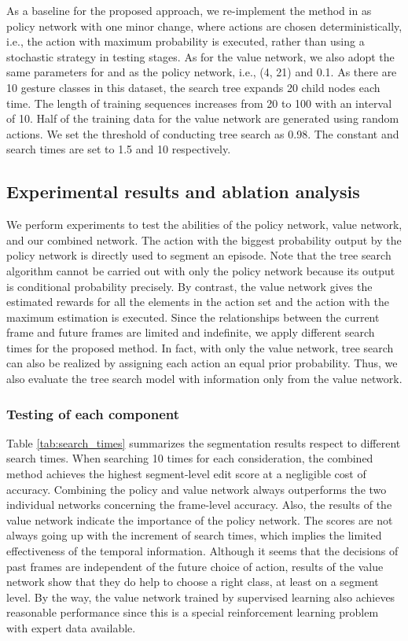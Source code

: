 \documentclass[letterpaper, 10 pt, conference]{ieeeconf}
\begin{document}
As a baseline for the proposed approach, we re-implement the method in \cite{liu2018deep} as policy network with one minor change, where actions are chosen deterministically, i.e., the action with maximum probability is executed, rather than using a stochastic strategy in testing stages. As for the value network, we also adopt the same parameters for  and  as the policy network, i.e., (4, 21) and 0.1. As there are 10 gesture classes in this dataset, the search tree expands 20 child nodes each time. The length  of training sequences increases from 20 to 100 with an interval of 10. Half of the training data for the value network are generated using random actions. We set the threshold of conducting tree search as 0.98. The constant  and search times are set to 1.5 and 10 respectively.


\subsection{Experimental results and ablation analysis}

We perform experiments to test the abilities of the policy network, value network, and our combined network. The action with the biggest probability output by the policy network is directly used to segment an episode. Note that the tree search algorithm cannot be carried out with only the policy network because its output is conditional probability precisely. By contrast, the value network gives the estimated rewards for all the elements in the action set and the action with the maximum estimation is executed. Since the relationships between the current frame and future frames are limited and indefinite, we apply different search times for the proposed method. In fact, with only the value network, tree search can also be realized by assigning each action an equal prior probability. Thus, we also evaluate the tree search model with information only from the value network. 

\subsubsection{Testing of each component}
Table \ref{tab:search_times} summarizes the segmentation results respect to different search times. When searching 10 times for each consideration, the combined method achieves the highest segment-level edit score at a negligible cost of accuracy. Combining the policy and value network always outperforms the two individual networks concerning the frame-level accuracy. Also, the results of the value network indicate the importance of the policy network. The scores are not always going up with the increment of search times, which implies the limited effectiveness of the temporal information. Although it seems that the decisions of past frames are independent of the future choice of action, results of the value network show that they do help to choose a right class, at least on a segment level. By the way, the value network trained by supervised learning also achieves reasonable performance since this is a special reinforcement learning problem with expert data available.
\end{document}
